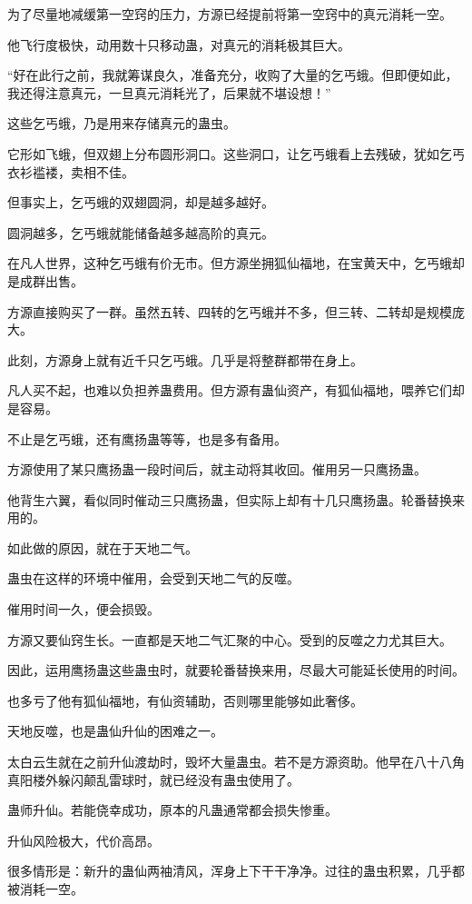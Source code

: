 \begin{this_body}
为了尽量地减缓第一空窍的压力，方源已经提前将第一空窍中的真元消耗一空。

他飞行度极快，动用数十只移动蛊，对真元的消耗极其巨大。

“好在此行之前，我就筹谋良久，准备充分，收购了大量的乞丐蛾。但即便如此，我还得注意真元，一旦真元消耗光了，后果就不堪设想！”

这些乞丐蛾，乃是用来存储真元的蛊虫。

它形如飞蛾，但双翅上分布圆形洞口。这些洞口，让乞丐蛾看上去残破，犹如乞丐衣衫褴褛，卖相不佳。

但事实上，乞丐蛾的双翅圆洞，却是越多越好。

圆洞越多，乞丐蛾就能储备越多越高阶的真元。

在凡人世界，这种乞丐蛾有价无市。但方源坐拥狐仙福地，在宝黄天中，乞丐蛾却是成群出售。

方源直接购买了一群。虽然五转、四转的乞丐蛾并不多，但三转、二转却是规模庞大。

此刻，方源身上就有近千只乞丐蛾。几乎是将整群都带在身上。

凡人买不起，也难以负担养蛊费用。但方源有蛊仙资产，有狐仙福地，喂养它们却是容易。

不止是乞丐蛾，还有鹰扬蛊等等，也是多有备用。

方源使用了某只鹰扬蛊一段时间后，就主动将其收回。催用另一只鹰扬蛊。

他背生六翼，看似同时催动三只鹰扬蛊，但实际上却有十几只鹰扬蛊。轮番替换来用的。

如此做的原因，就在于天地二气。

蛊虫在这样的环境中催用，会受到天地二气的反噬。

催用时间一久，便会损毁。

方源又要仙窍生长。一直都是天地二气汇聚的中心。受到的反噬之力尤其巨大。

因此，运用鹰扬蛊这些蛊虫时，就要轮番替换来用，尽最大可能延长使用的时间。

也多亏了他有狐仙福地，有仙资辅助，否则哪里能够如此奢侈。

天地反噬，也是蛊仙升仙的困难之一。

太白云生就在之前升仙渡劫时，毁坏大量蛊虫。若不是方源资助。他早在八十八角真阳楼外躲闪颠乱雷球时，就已经没有蛊虫使用了。

蛊师升仙。若能侥幸成功，原本的凡蛊通常都会损失惨重。

升仙风险极大，代价高昂。

很多情形是：新升的蛊仙两袖清风，浑身上下干干净净。过往的蛊虫积累，几乎都被消耗一空。


\end{this_body}

